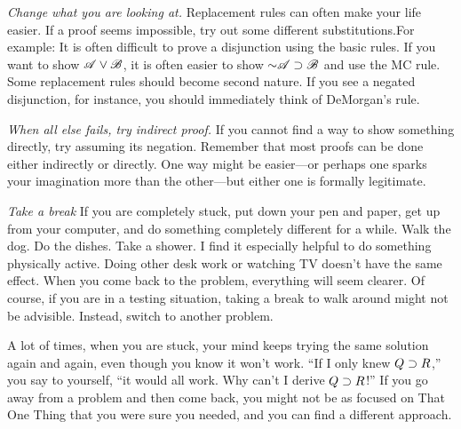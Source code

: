 {%

\emph{Change what you are looking at.} Replacement rules can often make your life easier. If a proof seems impossible, try out some different substitutions.For example: It is often difficult to prove a disjunction using the basic rules. If you want to show $\mathscr{A}\vee\mathscr{B}$, it is often easier to show $\mathord{\sim}\mathscr{A}\supset\mathscr{B}$ and use the MC rule. Some replacement rules should become second nature. If you see a negated disjunction, for instance, you should immediately think of DeMorgan's rule.

\emph{When all else fails, try indirect proof.} If you cannot find a way to show something directly, try assuming its negation. Remember that most proofs can be done either indirectly or directly. One way might be easier---or perhaps one sparks your imagination more than the other---but either one is formally legitimate.



\emph{Take a break} If you are completely stuck, put down your pen and paper, get up from your computer, and do something completely different for a while. Walk the dog. Do the dishes. Take a shower. I find it especially helpful to do something physically active. Doing other desk work or watching TV doesn't have the same effect. When you come back to the problem, everything will seem clearer. Of course, if you are in a testing situation, taking a break to walk around might not be advisible. Instead, switch to another problem.

A lot of times, when you are stuck, your mind keeps trying the same solution again and again, even though you know it won't work. ``If I only knew $Q \supset R$,'' you say to yourself, ``it would all work. Why can't I derive $Q \supset R$!'' If you go away from a problem and then come back, you might not be as focused on That One Thing that you were sure you needed, and you can find a different approach.

	



}
